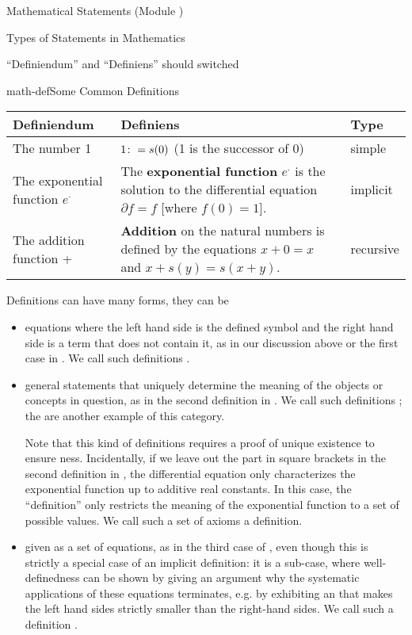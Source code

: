 \begin{tchapter}[id=statements,short=Mathematical Statements]{Mathematical Statements (Module {})}
\begin{tsection}[id=statements-constitutive]{Types of Statements in Mathematics}
\begin{erratum}[reported-by=Krzysztof Retel,date=2006-09-14]{``Definiendum'' and ``Definiens''
  should switched}
\begin{myfig}{math-def}{Some Common Definitions}\small
 \begin{tabular}{|p{2.2cm}|p{7cm}|l|}\hline
   Definiendum & Definiens & Type \\\hline\hline
   The number 1 & $1\colon= s(0)$ (1 is the successor of 0) & simple\\\hline
   The exponential function $e^\cdot$ 
         &  The {\textbf{exponential function}} $e^\cdot$ is the solution to the
   differential equation $\partial f=f$ [where $f(0)=1$]. & implicit\\\hline
   The addition function + & {\textbf{Addition}} on the natural numbers is defined by the equations
   $x+0=x$ and $x+s(y)=s(x+y)$. & recursive\\\hline
 \end{tabular}
\end{myfig}
\end{erratum}
Definitions can have many forms, they can be
\begin{itemize}
\item equations where the left hand side is the defined symbol and the right hand side is
  a term that does not contain it, as in our discussion above or the first case in
  {}. We call such definitions
  {}.
\item general statements that uniquely determine the meaning of the objects or concepts in
  question, as in the second definition in {}. We call such definitions
  {}; the {} are
  another example of this category.
  
  Note that this kind of definitions requires a proof of unique existence to ensure
  {ness}.  Incidentally, if we leave out the part in square
  brackets in the second definition in {}, the differential equation
  only characterizes the exponential function up to additive real constants. In this case,
  the ``definition'' only restricts the meaning of the exponential function to a set of
  possible values.  We call such a set of axioms a
  {} definition.
\item given as a set of equations, as in the third case of {}, even
  though this is strictly a special case of an implicit definition: it is a sub-case,
  where well-definedness can be shown by giving an argument why the systematic
  applications of these equations terminates, e.g.  by exhibiting an
  {} that makes the left hand sides strictly smaller than the
  right-hand sides. We call such a definition
  {}.
\end{itemize}
\end{tsection}


\end{tchapter}
